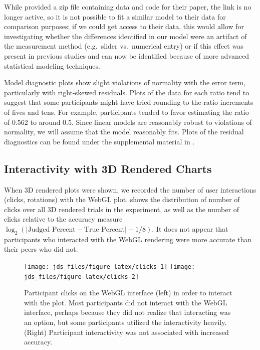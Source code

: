 \documentclass[letterpaper,inpress,dvipsnames]{jdsart}
\begin{document}
While \citeauthor{heerCrowdsourcingGraphicalPerception2010b} provided a zip file containing data and code for their paper, the link is no longer active, so it is not possible to fit a similar model to their data for comparison purposes; if we could get access to their data, this would allow for investigating whether the differences identified in our model were an artifact of the measurement method (e.g.~slider vs.~numerical entry) or if this effect was present in previous studies and can now be identified because of more advanced statistical modeling techniques.

Model diagnostic plots show slight violations of normality with the error term, particularly with right-skewed residuals.
Plots of the data for each ratio tend to suggest that some participants might have tried rounding to the ratio increments of fives and tens.
For example, participants tended to favor estimating the ratio of 0.562 to around 0.5.
Since linear models are reasonably robust to violations of normality, we will assume that the model reasonably fits.
Plots of the residual diagnostics can be found under the supplemental material in .

\hypertarget{interactivity-with-3d-rendered-charts}{%
\subsection{Interactivity with 3D Rendered Charts}\label{interactivity-with-3d-rendered-charts}}

When 3D rendered plots were shown, we recorded the number of user interactions (clicks, rotations) with the WebGL plot.  shows the distribution of number of clicks over all 3D rendered trials in the experiment, as well as the number of clicks relative to the accuracy measure \(\log_2(|\text{Judged Percent} - \text{True Percent}|+1/8)\). It does not appear that participants who interacted with the WebGL rendering were more accurate than their peers who did not.

\begin{figure}
\texttt{[image: jds\_files/figure-latex/clicks-1]} \texttt{[image: jds\_files/figure-latex/clicks-2]} \caption{Participant clicks on the WebGL interface (left) in order to interact with the plot. Most participants did not interact with the WebGL interface, perhaps because they did not realize that interacting was an option, but some participants utilized the interactivity heavily. (Right) Participant interactivity was not associated with increased accuracy.}\label{fig:clicks}
\end{figure}
\end{document}
